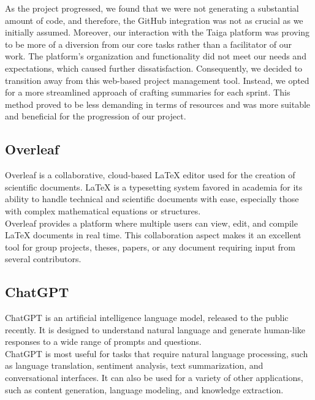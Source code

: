 As the project progressed, we found that we were not generating a substantial amount of code, and therefore, the GitHub integration was not as crucial as we initially assumed. Moreover, our interaction with the Taiga platform was proving to be more of a diversion from our core tasks rather than a facilitator of our work. The platform's organization and functionality did not meet our needs and expectations, which caused further dissatisfaction. Consequently, we decided to transition away from this web-based project management tool. Instead, we opted for a more streamlined approach of crafting summaries for each sprint. This method proved to be less demanding in terms of resources and was more suitable and beneficial for the progression of our project.\\


\subsection{Overleaf}
Overleaf is a collaborative, cloud-based LaTeX editor used for the creation of scientific documents. LaTeX is a typesetting system favored in academia for its ability to handle technical and scientific documents with ease, especially those with complex mathematical equations or structures.\\

Overleaf provides a platform where multiple users can view, edit, and compile LaTeX documents in real time. This collaboration aspect makes it an excellent tool for group projects, theses, papers, or any document requiring input from several contributors.\\

\subsection{ChatGPT}
ChatGPT is an artificial intelligence language model, released to the public recently. It is designed to understand natural language and generate human-like responses to a wide range of prompts and questions.\\

ChatGPT is most useful for tasks that require natural language processing, such as language translation, sentiment analysis, text summarization, and conversational interfaces. It can also be used for a variety of other applications, such as content generation, language modeling, and knowledge extraction.\\

